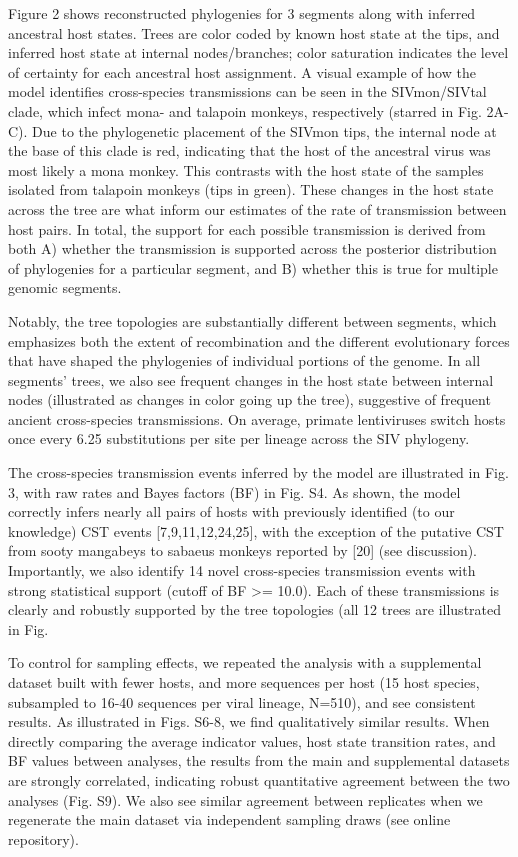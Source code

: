 Figure 2 shows reconstructed phylogenies for 3 segments along with inferred ancestral host states.
Trees are color coded by known host state at the tips, and inferred host state at internal nodes/branches; color saturation indicates the level of certainty for each ancestral host assignment.
A visual example of how the model identifies cross-species transmissions can be seen in the SIVmon/SIVtal clade, which infect mona- and talapoin monkeys, respectively (starred in Fig. 2A-C).
Due to the phylogenetic placement of the SIVmon tips, the internal node at the base of this clade is red, indicating that the host of the ancestral virus was most likely a mona monkey.
This contrasts with the host state of the samples isolated from talapoin monkeys (tips in green).
These changes in the host state across the tree are what inform our estimates of the rate of transmission between host pairs.
In total, the support for each possible transmission is derived from both A) whether the transmission is supported across the posterior distribution of phylogenies for a particular segment, and B) whether this is true for multiple genomic segments.


Notably, the tree topologies are substantially different between segments, which emphasizes both the extent of recombination and the different evolutionary forces that have shaped the phylogenies of individual portions of the genome.
In all segments’ trees, we also see frequent changes in the host state between internal nodes (illustrated as changes in color going up the tree), suggestive of frequent ancient cross-species transmissions.
On average, primate lentiviruses switch hosts once every 6.25 substitutions per site per lineage across the SIV phylogeny.

The cross-species transmission events inferred by the model are illustrated in Fig. 3, with raw rates and Bayes factors (BF) in Fig. S4.
As shown, the model correctly infers nearly all pairs of hosts with previously identified (to our knowledge) CST events [7,9,11,12,24,25], with the exception of the putative CST from sooty mangabeys to sabaeus monkeys reported by [20] (see discussion).
Importantly, we also identify 14 novel cross-species transmission events with strong statistical support (cutoff of BF >= 10.0).
Each of these transmissions is clearly and robustly supported by the tree topologies (all 12 trees are illustrated in Fig.

To control for sampling effects, we repeated the analysis with a supplemental dataset built with fewer hosts, and more sequences per host (15 host species, subsampled to 16-40 sequences per viral lineage, N=510), and see consistent results.
As illustrated in Figs. S6-8, we find qualitatively similar results.
When directly comparing the average indicator values, host state transition rates, and BF values between analyses, the results from the main and supplemental datasets are strongly correlated, indicating robust quantitative agreement between the two analyses (Fig. S9).
We also see similar agreement between replicates when we regenerate the main dataset via independent sampling draws (see online repository).

